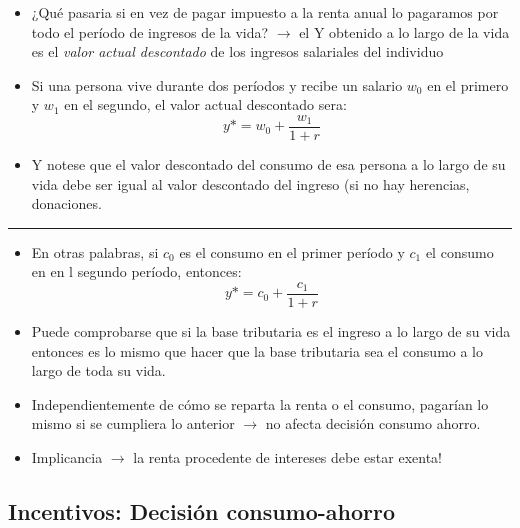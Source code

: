 \documentclass[
  letterpaper,
  DIV=11,
  numbers=noendperiod]{scrartcl}
\providecommand{\tightlist}{%
  \setlength{\itemsep}{0pt}\setlength{\parskip}{0pt}}\usepackage{longtable,booktabs,array}
\begin{document}
\begin{itemize}
\tightlist
\item
  ¿Qué pasaria si en vez de pagar impuesto a la renta anual lo pagaramos
  por todo el período de ingresos de la vida? \(\longrightarrow\) el Y
  obtenido a lo largo de la vida es el \emph{valor actual descontado} de
  los ingresos salariales del individuo
\item
  Si una persona vive durante dos períodos y recibe un salario \(w_0\)
  en el primero y \(w_1\) en el segundo, el valor actual descontado
  sera: \[y*=w_0+\frac{w_1}{1+r}\]
\item
  Y notese que el valor descontado del consumo de esa persona a lo largo
  de su vida debe ser igual al valor descontado del ingreso (si no hay
  herencias, donaciones.
\end{itemize}

\begin{center}\rule{0.5\linewidth}{0.5pt}\end{center}

\begin{itemize}
\tightlist
\item
  En otras palabras, si \(c_0\) es el consumo en el primer período y
  \(c_1\) el consumo en en l segundo período, entonces:
  \[y*=c_0+\frac{c_1}{1+r}\]
\item
  Puede comprobarse que si la base tributaria es el ingreso a lo largo
  de su vida entonces es lo mismo que hacer que la base tributaria sea
  el consumo a lo largo de toda su vida.
\item
  Independientemente de cómo se reparta la renta o el consumo, pagarían
  lo mismo si se cumpliera lo anterior \(\longrightarrow\) no afecta
  decisión consumo ahorro.
\item
  Implicancia \(\longrightarrow\) la renta procedente de intereses debe
  estar exenta!
\end{itemize}

\subsection{Incentivos: Decisión
consumo-ahorro}\label{incentivos-decisiuxf3n-consumo-ahorro}
\end{document}
